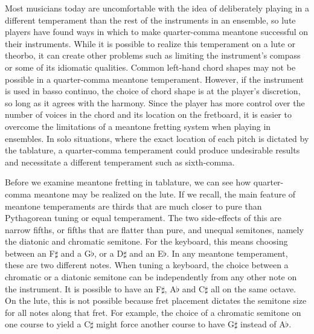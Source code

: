 Most musicians today are uncomfortable with the idea of deliberately playing in a
different temperament than the rest of the instruments in an ensemble, so lute players
have found ways in which to make quarter-comma meantone successful on their
instruments. While it is possible to realize this temperament on a lute or theorbo, it
can create other problems such as limiting the instrument's compass or some of its
idiomatic qualities.  Common left-hand chord shapes may not be possible in a
quarter-comma meantone temperament.  However, if the instrument is used in basso
continuo, the choice of chord shape is at the player's discretion, so long as it agrees
with the harmony.  Since the player has more control over the number of voices in the
chord and its location on the fretboard, it is easier to overcome the limitations of a
meantone fretting system when playing in ensembles.  In solo situations, where the
exact location of each pitch is dictated by the tablature, a quarter-comma temperament
could produce undesirable results and necessitate a different temperament such as
sixth-comma.

Before we examine meantone fretting in tablature, we can see how quarter-comma meantone
may be realized on the lute.  If we recall, the main feature of meantone temperaments
are thirds that are much closer to pure than Pythagorean tuning or equal temperament.
The two side-effects of this are narrow fifths, or fifths that are flatter than pure,
and unequal semitones, namely the diatonic and chromatic semitone.  For the keyboard,
this means choosing between an F$\sharp$ and a G$\flat$, or a D$\sharp$ and an
E$\flat$.  In any meantone temperament, these are two different notes.  When tuning a
keyboard, the choice between a chromatic or a diatonic semitone can be independently
from any other note on the instrument. It is possible to have an F$\sharp$, A$\flat$
and C$\sharp$ all on the same octave.  On the lute, this is not possible because fret
placement dictates the semitone size for all notes along that fret. For example, the
choice of a chromatic semitone on one course to yield a C$\sharp$ might force another
course to have G$\sharp$ instead of A$\flat$.

